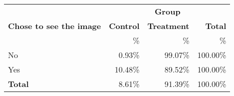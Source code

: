 \documentclass{article}
\begin{document}
\begin{tabular}{lrrr}
\hline
 & \multicolumn{3}{c}{\textbf{Group}} \\
\textbf{Chose to see the image}&\textbf{Control}&\textbf{Treatment}&\textbf{Total} \\
&\%&\%&\% \\
\hline
No&0.93\%&99.07\%&100.00\% \\
Yes&10.48\%&89.52\%&100.00\% \\
\textbf{Total}&8.61\%&91.39\%&100.00\% \\
\hline
\end{tabular}
\end{document}
